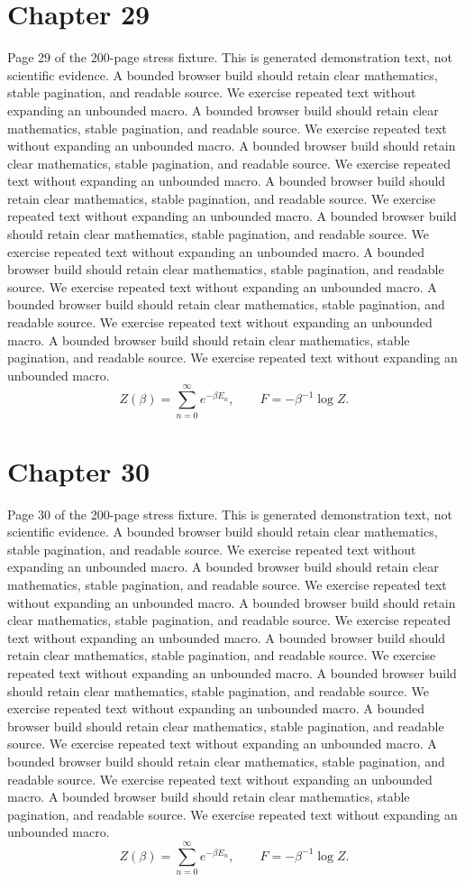 \documentclass[11pt]{article}
\begin{document}
\section*{Chapter 29}
Page 29 of the 200-page stress fixture. This is generated demonstration text, not scientific evidence.
A bounded browser build should retain clear mathematics, stable pagination, and readable source. We exercise repeated text without expanding an unbounded macro.
A bounded browser build should retain clear mathematics, stable pagination, and readable source. We exercise repeated text without expanding an unbounded macro.
A bounded browser build should retain clear mathematics, stable pagination, and readable source. We exercise repeated text without expanding an unbounded macro.
A bounded browser build should retain clear mathematics, stable pagination, and readable source. We exercise repeated text without expanding an unbounded macro.
A bounded browser build should retain clear mathematics, stable pagination, and readable source. We exercise repeated text without expanding an unbounded macro.
A bounded browser build should retain clear mathematics, stable pagination, and readable source. We exercise repeated text without expanding an unbounded macro.
A bounded browser build should retain clear mathematics, stable pagination, and readable source. We exercise repeated text without expanding an unbounded macro.
A bounded browser build should retain clear mathematics, stable pagination, and readable source. We exercise repeated text without expanding an unbounded macro.
\[Z(\beta)=\sum_{n=0}^{\infty}e^{-\beta E_n},\qquad F=-\beta^{-1}\log Z.\]
\newpage
\section*{Chapter 30}
Page 30 of the 200-page stress fixture. This is generated demonstration text, not scientific evidence.
A bounded browser build should retain clear mathematics, stable pagination, and readable source. We exercise repeated text without expanding an unbounded macro.
A bounded browser build should retain clear mathematics, stable pagination, and readable source. We exercise repeated text without expanding an unbounded macro.
A bounded browser build should retain clear mathematics, stable pagination, and readable source. We exercise repeated text without expanding an unbounded macro.
A bounded browser build should retain clear mathematics, stable pagination, and readable source. We exercise repeated text without expanding an unbounded macro.
A bounded browser build should retain clear mathematics, stable pagination, and readable source. We exercise repeated text without expanding an unbounded macro.
A bounded browser build should retain clear mathematics, stable pagination, and readable source. We exercise repeated text without expanding an unbounded macro.
A bounded browser build should retain clear mathematics, stable pagination, and readable source. We exercise repeated text without expanding an unbounded macro.
A bounded browser build should retain clear mathematics, stable pagination, and readable source. We exercise repeated text without expanding an unbounded macro.
\[Z(\beta)=\sum_{n=0}^{\infty}e^{-\beta E_n},\qquad F=-\beta^{-1}\log Z.\]
\newpage
\end{document}
